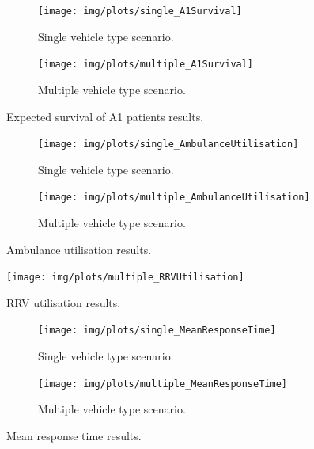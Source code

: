 \documentclass[numbers,webpdf,imaman]{ima-authoring-template}%
\begin{document}
\begin{figure}[htb!]
\begin{center}
\begin{subfigure}{0.4\textwidth}
\texttt{[image: img/plots/single\_A1Survival]}
\caption{Single vehicle type scenario.}
\label{fig:results_a1survival_single}
\end{subfigure}
\begin{subfigure}{0.4\textwidth}
\texttt{[image: img/plots/multiple\_A1Survival]}
\caption{Multiple vehicle type scenario.}
\label{fig:results_a1survival_multiple}
\end{subfigure}
\end{center}
\caption{Expected survival of A1 patients results.}
\label{fig:results_a1survival}
\end{figure}

\begin{figure}[htb!]
\begin{center}
\begin{subfigure}{0.4\textwidth}
\texttt{[image: img/plots/single\_AmbulanceUtilisation]}
\caption{Single vehicle type scenario.}
\label{fig:results_ambulance_utilisation_single}
\end{subfigure}
\begin{subfigure}{0.4\textwidth}
\texttt{[image: img/plots/multiple\_AmbulanceUtilisation]}
\caption{Multiple vehicle type scenario.}
\label{fig:results_ambulance_utilisation_multiple}
\end{subfigure}
\end{center}
\caption{Ambulance utilisation results.}
\label{fig:results_ambulance_utilisation}
\end{figure}

\begin{figure}[htb!]
\begin{center}
\texttt{[image: img/plots/multiple\_RRVUtilisation]}
\end{center}
\caption{RRV utilisation results.}
\label{fig:results_rrv_utilisation_multiple}
\end{figure}

\begin{figure}[htb!]
\begin{center}
\begin{subfigure}{0.4\textwidth}
\texttt{[image: img/plots/single\_MeanResponseTime]}
\caption{Single vehicle type scenario.}
\label{fig:results_response_single}
\end{subfigure}
\begin{subfigure}{0.4\textwidth}
\texttt{[image: img/plots/multiple\_MeanResponseTime]}
\caption{Multiple vehicle type scenario.}
\label{fig:results_response_multiple}
\end{subfigure}
\end{center}
\caption{Mean response time results.}
\end{figure}
\end{document}

